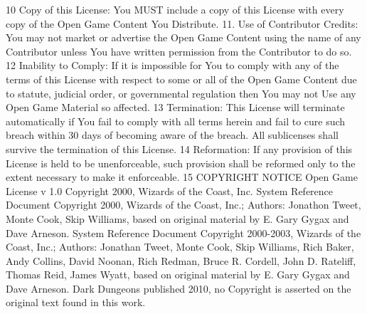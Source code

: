 \begin{multicols}{2}
10 Copy of this License: You MUST include a copy of this License with every copy of the Open Game Content You Distribute.
11. Use of Contributor Credits: You may not market or advertise the Open Game Content using the name of any Contributor unless You have written permission from the Contributor to do so.
12 Inability to Comply: If it is impossible for You to comply with any of the terms of this License with respect to some or all of the Open Game Content due to statute, judicial order, or governmental regulation then You may not Use any Open Game Material so affected.
13 Termination: This License will terminate automatically if You fail to comply with all terms herein and fail to cure such breach within 30 days of becoming aware of the breach. All sublicenses shall survive the termination of this License.
14 Reformation: If any provision of this License is held to be unenforceable, such provision shall be reformed only to the extent necessary to make it enforceable.
15 COPYRIGHT NOTICE
Open Game License v 1.0 Copyright 2000, Wizards of the Coast, Inc.
System Reference Document Copyright 2000, Wizards of the Coast, Inc.; Authors: Jonathon Tweet, Monte Cook, Skip Williams, based on original material by E. Gary Gygax and Dave Arneson.
System Reference Document Copyright 2000-2003, Wizards of the Coast, Inc.; Authors: Jonathan Tweet, Monte Cook, Skip Williams, Rich Baker, Andy Collins, David Noonan, Rich Redman, Bruce R. Cordell, John D. Rateliff, Thomas Reid, James Wyatt, based on original material by E. Gary Gygax and Dave Arneson.
Dark Dungeons published 2010, no Copyright is asserted on the original text found in this work.
\normalfont
\end{multicols}

